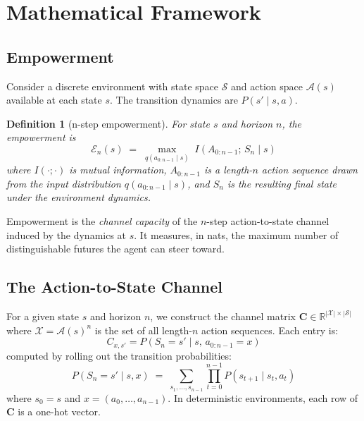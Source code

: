 \documentclass[11pt]{article}
\newtheorem{definition}{Definition}
\newcommand{\E}{\mathcal{E}}
\begin{document}
\section{Mathematical Framework}
\label{sec:math}

\subsection{Empowerment}

Consider a discrete environment with state space $\mathcal{S}$ and
action space $\mathcal{A}(s)$ available at each state $s$.  The
transition dynamics are $P(s' \mid s, a)$.

\begin{definition}[n-step empowerment]
For state $s$ and horizon $n$, the \emph{empowerment} is
\begin{equation}
  \E_n(s) \;=\; \max_{q(a_{0:n-1} \mid s)}\; I(A_{0:n-1};\, S_n \mid s)
  \label{eq:empowerment}
\end{equation}
where $I(\cdot;\cdot)$ is mutual information, $A_{0:n-1}$ is a
length-$n$ action sequence drawn from the input distribution
$q(a_{0:n-1} \mid s)$, and $S_n$ is the resulting final state under
the environment dynamics.
\end{definition}

Empowerment is the \emph{channel capacity} of the $n$-step
action-to-state channel induced by the dynamics at $s$.  It measures,
in nats, the maximum number of distinguishable futures the agent can
steer toward.

\subsection{The Action-to-State Channel}

For a given state $s$ and horizon $n$, we construct the channel matrix
$\mathbf{C} \in \mathbb{R}^{|\mathcal{X}| \times |\mathcal{S}|}$
where $\mathcal{X} = \mathcal{A}(s)^n$ is the set of all length-$n$
action sequences.  Each entry is:
\begin{equation}
  C_{x,s'} = P(S_n = s' \mid s,\, a_{0:n-1} = x)
\end{equation}
computed by rolling out the transition probabilities:
\begin{equation}
  P(S_n = s' \mid s, x) \;=\;
    \sum_{s_1, \ldots, s_{n-1}}
    \prod_{t=0}^{n-1} P(s_{t+1} \mid s_t, a_t)
\end{equation}
where $s_0 = s$ and $x = (a_0, \ldots, a_{n-1})$.  In deterministic
environments, each row of $\mathbf{C}$ is a one-hot vector.
\end{document}
